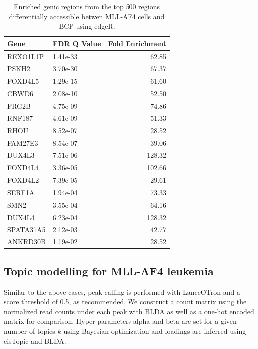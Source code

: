 \begin{table}

    \centering
    \begin{tabular}[t]{llr}
    \toprule
    Gene & FDR Q Value & Fold Enrichment\\
    \midrule
    REXO1L1P & 1.41e-33 & 62.85\\ %
    PSKH2 & 3.70e-30 & 67.37\\ 
    FOXD4L5 & 1.29e-15 & 61.60\\
    CBWD6 & 2.08e-10 & 52.50\\
    FRG2B & 4.75e-09 & 74.86\\
    \addlinespace
    RNF187 & 4.61e-09 & 51.33\\
    RHOU & 8.52e-07 & 28.52\\
    FAM27E3 & 8.54e-07 & 39.06\\
    DUX4L3 & 7.51e-06 & 128.32\\
    FOXD4L4 & 3.36e-05 & 102.66\\
    \addlinespace
    FOXD4L2 & 7.39e-05 & 29.61\\
    SERF1A & 1.94e-04 & 73.33\\
    SMN2 & 3.55e-04 & 64.16\\
    DUX4L4 & 6.23e-04 & 128.32\\
    SPATA31A5 & 2.12e-03 & 42.77\\
    \addlinespace
    ANKRD30B & 1.19e-02 & 28.52\\
    \bottomrule
    \end{tabular}

    \caption{\label{tab:table:mll_edger_genes}Enriched genic regions from the top 500 regions differentially accessible betwen MLL-AF4 cells and BCP using edgeR.}
\end{table}

\subsection{Topic modelling for MLL-AF4 leukemia}



Similar to the above cases, peak calling is performed with LanceOTron and a score threshold of 0.5, as recommended. We construct a count matrix using the normalized read counts under each peak with BLDA as well as a one-hot encoded matrix for comparison.  Hyper-parameters alpha and beta are set for a given number of topics $k$ using Bayesian optimization and loadings are inferred using cisTopic and BLDA. 

